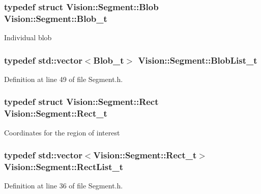 \subsubsection[{Blob\+\_\+t}]{\setlength{\rightskip}{0pt plus 5cm}typedef struct {\bf Vision\+::\+Segment\+::\+Blob}  {\bf Vision\+::\+Segment\+::\+Blob\+\_\+t}}\label{class_vision_1_1_segment_add6c81230e499b159218c5232e3b76ae}
Individual blob \hypertarget{class_vision_1_1_segment_a60e08251e2ab94239e245044c31cde51}{}
\subsubsection[{Blob\+List\+\_\+t}]{\setlength{\rightskip}{0pt plus 5cm}typedef std\+::vector$<${\bf Blob\+\_\+t}$>$ {\bf Vision\+::\+Segment\+::\+Blob\+List\+\_\+t}}\label{class_vision_1_1_segment_a60e08251e2ab94239e245044c31cde51}


Definition at line 49 of file Segment.\+h.

\hypertarget{class_vision_1_1_segment_af9428422a82edaab8a1e5ba59acc8c16}{}
\subsubsection[{Rect\+\_\+t}]{\setlength{\rightskip}{0pt plus 5cm}typedef struct {\bf Vision\+::\+Segment\+::\+Rect}  {\bf Vision\+::\+Segment\+::\+Rect\+\_\+t}}\label{class_vision_1_1_segment_af9428422a82edaab8a1e5ba59acc8c16}
Coordinates for the region of interest \hypertarget{class_vision_1_1_segment_aaaa7a3b37f6fa4402bc1309e9bf74bec}{}
\subsubsection[{Rect\+List\+\_\+t}]{\setlength{\rightskip}{0pt plus 5cm}typedef std\+::vector$<${\bf Vision\+::\+Segment\+::\+Rect\+\_\+t}$>$ {\bf Vision\+::\+Segment\+::\+Rect\+List\+\_\+t}}\label{class_vision_1_1_segment_aaaa7a3b37f6fa4402bc1309e9bf74bec}


Definition at line 36 of file Segment.\+h.



